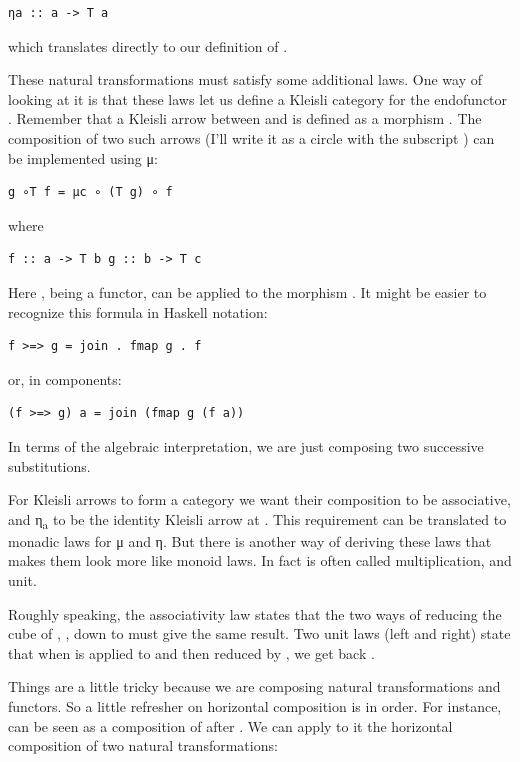 \begin{verbatim}
ηa :: a -> T a
\end{verbatim}

which translates directly to our definition of .

These natural transformations must satisfy some additional laws. One way
of looking at it is that these laws let us define a Kleisli category for
the endofunctor . Remember that a Kleisli arrow between
 and  is defined as a morphism
. The composition of two such arrows
(I'll write it as a circle with the subscript ) can be
implemented using μ:

\begin{verbatim}
g ∘T f = μc ∘ (T g) ∘ f
\end{verbatim}

where

\begin{verbatim}
f :: a -> T b g :: b -> T c
\end{verbatim}

Here , being a functor, can be applied to the morphism
. It might be easier to recognize this formula in Haskell
notation:

\begin{verbatim}
f >=> g = join . fmap g . f
\end{verbatim}

or, in components:

\begin{verbatim}
(f >=> g) a = join (fmap g (f a))
\end{verbatim}

In terms of the algebraic interpretation, we are just composing two
successive substitutions.

For Kleisli arrows to form a category we want their composition to be
associative, and η\textsubscript{a} to be the identity Kleisli arrow at
. This requirement can be translated to monadic laws for μ and
η. But there is another way of deriving these laws that makes them look
more like monoid laws. In fact  is often called
multiplication, and  unit.

Roughly speaking, the associativity law states that the two ways of
reducing the cube of , , down to  must
give the same result. Two unit laws (left and right) state that when
 is applied to  and then reduced by , we
get back .

Things are a little tricky because we are composing natural
transformations and functors. So a little refresher on horizontal
composition is in order. For instance,  can be seen as a
composition of  after . We can apply to it the
horizontal composition of two natural transformations:

